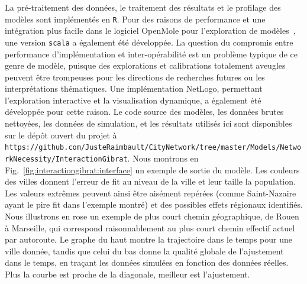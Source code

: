 {La pré-traitement des données, le traitement des résultats et le profilage des modèles sont implémentés en \texttt{R}. Pour des raisons de performance et une intégration plus facile dans le logiciel OpenMole pour l'exploration de modèles~\cite{reuillon2013openmole}, une version \texttt{scala} a également été développée. La question du compromis entre performance d'implémentation et inter-opérabilité est un problème typique de ce genre de modèle, puisque des explorations et calibrations totalement aveugles peuvent être trompeuses pour les directions de recherches futures ou les interprétations thématiques. Une implémentation NetLogo, permettant l'exploration interactive et la visualisation dynamique, a également été développée pour cette raison. Le code source des modèles, les données brutes nettoyées, les données de simulation, et les résultats utilisés ici sont disponibles sur le dépôt ouvert du projet à \texttt{https://github.com/JusteRaimbault/CityNetwork/tree/master/Models/NetworkNecessity/InteractionGibrat}. Nous montrons en Fig.~\ref{fig:interactiongibrat:interface} un exemple de sortie du modèle. Les couleurs des villes donnent l'erreur de fit au niveau de la ville et leur taille la population. Les valeurs extrêmes peuvent ainsi être aisément repérées (comme Saint-Nazaire ayant le pire fit dans l'exemple montré) et des possibles effets régionaux identifiés. Nous illustrons en rose un exemple de plus court chemin géographique, de Rouen à Marseille, qui correspond raisonnablement au plus court chemin effectif actuel par autoroute. Le graphe du haut montre la trajectoire dans le temps pour une ville donnée, tandis que celui du bas donne la qualité globale de l'ajustement dans le temps, en traçant les données simulées en fonction des données réelles. Plus la courbe est proche de la diagonale, meilleur est l'ajustement.
}

